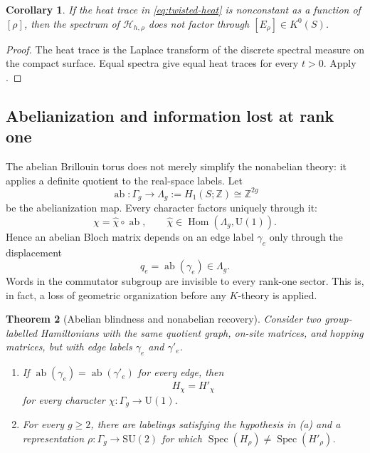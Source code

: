 \documentclass[11pt]{article}
\newtheorem{theorem}{Theorem}[section]
\newtheorem{corollary}[theorem]{Corollary}
\theoremstyle{definition}
\theoremstyle{remark}
\newcommand{\ZZ}{\mathbb Z}
\newcommand{\UU}{\mathrm U}
\newcommand{\SU}{\mathrm{SU}}
\newcommand{\Hom}{\operatorname{Hom}}
\newcommand{\spec}{\operatorname{Spec}}
\newcommand{\cH}{\mathcal H}
\begin{document}
\begin{corollary}
\label{cor:heat-nonfactor}
If the heat trace in \eqref{eq:twisted-heat} is nonconstant as a function of
\([\rho]\), then the spectrum of \(\cH_{h,\rho}\) does not factor through
\([E_\rho]\in K^0(S)\).
\end{corollary}

\begin{proof}
The heat trace is the Laplace transform of the discrete spectral measure on
the compact surface.  Equal spectra give equal heat traces for every \(t>0\).
Apply .
\end{proof}

\subsection{Abelianization and information lost at rank one}

The abelian Brillouin torus does not merely simplify the nonabelian theory:
it applies a definite quotient to the real-space labels.  Let
\[
 \operatorname{ab}:\Gamma_g\longrightarrow
 \Lambda_g:=H_1(S;\ZZ)\cong\ZZ^{2g}
\tag{4.16}\label{eq:abelianization}
\]
be the abelianization map.  Every character factors uniquely through it:
\[
 \chi=\widehat\chi\circ\operatorname{ab},
 \qquad \widehat\chi\in\Hom(\Lambda_g,\UU(1)).
\]
Hence an abelian Bloch matrix depends on an edge label \(\gamma_e\) only
through the displacement
\[
                       q_e=\operatorname{ab}(\gamma_e)\in\Lambda_g.
                       \tag{4.17}\label{eq:abelian-edge-displacement}
\]
Words in the commutator subgroup are invisible to every rank-one sector.
This is, in fact, a loss of geometric organization before any \(K\)-theory is applied.

\begin{theorem}[Abelian blindness and nonabelian recovery]
\label{thm:abelian-blindness}
Consider two group-labelled Hamiltonians with the same quotient graph,
on-site matrices, and hopping matrices, but with edge labels
\(\gamma_e\) and \(\gamma'_e\).

\begin{enumerate}[label=\textup{(\alph*)},leftmargin=2.5em]
\item If
  \(\operatorname{ab}(\gamma_e)=\operatorname{ab}(\gamma'_e)\) for every
  edge, then
  \[
                         H_\chi=H'_\chi
  \]
  for every character \(\chi:\Gamma_g\to\UU(1)\).
\item For every \(g\geq2\), there are labelings satisfying the hypothesis in
  \textup{(a)} and a representation
  \(\rho:\Gamma_g\to\SU(2)\) for which
  \(\spec(H_\rho)\neq\spec(H'_\rho)\).
\end{enumerate}
\end{theorem}
\end{document}
